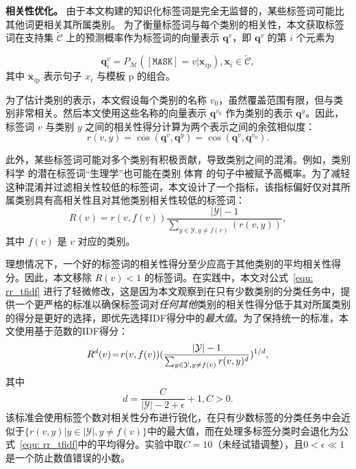 \textbf{相关性优化。}
由于本文构建的知识化标签词是完全无监督的，某些标签词可能比其他词更相关其所属类别。
为了衡量标签词与每个类别的相关性，本文获取标签词在支持集 $\tilde{\mathcal{C}}$ 上的预测概率作为标签词的向量表示 $\mathbf{q}^{v}$，即 $\mathbf{q}^{v}$ 的第 $i$ 个元素为

\begin{equation}
    \mathbf{q}^{v}_i = P_{\mathcal{M}}([\texttt{MASK}]=v|\mathbf{x}_{i{\text{p}}}), \mathbf{x}_i\in \tilde{\mathcal{C}},
\end{equation}
其中 $\mathbf{x}_{i{\text{p}}}$ 表示句子 $x_i$ 与模板 $\text{p}$ 的组合。

为了估计类别的表示，本文假设每个类别的名称 $v_0$，虽然覆盖范围有限，但与类别非常相关。然后本文使用这些名称的向量表示 $\mathbf{q}^{v_0}$ 作为类别的表示 $\mathbf{q}^{y}$。因此，标签词 $v$ 与类别 $y$ 之间的相关性得分计算为两个表示之间的余弦相似度：
\begin{equation}
    r(v, y) = \operatorname{cos}(\mathbf{q}^{v}, \mathbf{q}^{y}) = \operatorname{cos}(\mathbf{q}^{v}, \mathbf{q}^{v_0}).
\end{equation}

此外，某些标签词可能对多个类别有积极贡献，导致类别之间的混淆。例如，类别 \textsc{科学} 的潜在标签词“生理学”也可能在类别 \textsc{体育} 的句子中被赋予高概率。为了减轻这种混淆并过滤相关性较低的标签词，本文设计了一个指标，该指标偏好仅对其所属类别具有高相关性且对其他类别相关性较低的标签词：
\begin{equation}
    R(v) = r(v, f(v)) \frac{|\mathcal{Y}|-1}{\sum_{y\in \mathcal{Y}, y\neq f(v)}(r(v,y))},
\label{equ: rr_tfidf}
\end{equation}
其中 $f(v)$ 是 $v$ 对应的类别。

理想情况下，一个好的标签词的相关性得分至少应高于其他类别的平均相关性得分。因此，本文移除 $R(v)<1$ 的标签词。在实践中，本文对公式~\eqref{equ: rr_tfidf} 进行了轻微修改，这是因为本文观察到在只有少数类别的分类任务中，提供一个更严格的标准以确保标签词对\emph{任何其他}类别的相关性得分低于其对所属类别的得分是更好的选择，即优先选择IDF得分中的\emph{最大值}。为了保持统一的标准，本文使用基于范数的IDF得分：
\begin{equation}
    R^d(v)\! =\! r(v, f(v)) \large(\frac{|\mathcal{Y}|-1}{\sum_{y\in \mathcal{Y}, y\neq f(v)} r(v,y)^d}\large)^{1/d},
\end{equation}
其中
\begin{equation}
    d = \frac{C}{|\mathcal{Y}|-2+\epsilon} +1, C>0.
\end{equation}
该标准会使用标签个数对相关性分布进行锐化，在只有少数标签的分类任务中会近似于$\{r(v,y)|y\in |\mathcal{Y}|, y\neq f(v)\}$中的最大值，而在处理多标签分类时会退化为公式~\eqref{equ: rr_tfidf}中的平均得分。实验中取$C=10$（未经试错调整），且$0 < \epsilon\ll 1$是一个防止数值错误的小数。


